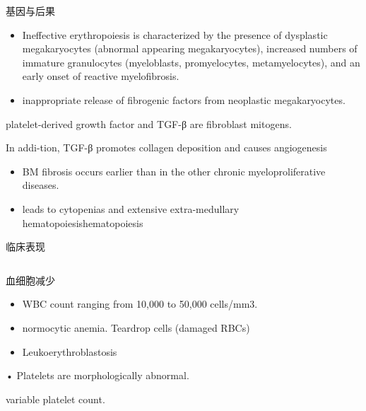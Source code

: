 \documentclass[
  ignorenonframetext,
]{beamer}
\begin{document}
\begin{frame}
\begin{block}{基因与后果}
\protect\hypertarget{ux57faux56e0ux4e0eux540eux679c-2}{}
\begin{itemize}
\item
  Ineffective erythropoiesis is characterized by the presence of
  dysplastic megakaryocytes (abnormal appearing megakaryocytes),
  increased numbers of immature granulocytes (myeloblasts,
  promyelocytes, metamyelocytes), and an early onset of reactive
  myelofibrosis.
\item
  inappropriate release of fibrogenic factors from neoplastic
  megakaryocytes.
\end{itemize}

platelet-derived growth factor and TGF-β are fibroblast mitogens.

In addi-tion, TGF-β promotes collagen deposition and causes angiogenesis

\begin{itemize}
\item
  BM fibrosis occurs earlier than in the other chronic
  myeloproliferative diseases.
\item
  leads to cytopenias and extensive extra-medullary
  hematopoiesishematopoiesis
\end{itemize}
\end{block}
\end{frame}

\begin{frame}
\begin{block}{临床表现}
\protect\hypertarget{ux4e34ux5e8aux8868ux73b0-2}{}
\begin{columns}[T]
\begin{column}{0.3\textwidth}
\begin{block}{血细胞减少}
\protect\hypertarget{ux8840ux7ec6ux80deux51cfux5c11}{}
\begin{itemize}
\item
  WBC count ranging from 10,000 to 50,000 cells/mm3.
\item
  normocytic anemia. Teardrop cells (damaged RBCs)
\item
  Leukoerythroblastosis
\end{itemize}

• Platelets are morphologically abnormal.

variable platelet count.
\end{block}
\end{column}

\begin{column}{0.3\textwidth}
\end{column}

\begin{column}{0.3\textwidth}
\end{column}
\end{columns}
\end{block}
\end{frame}
\end{document}
